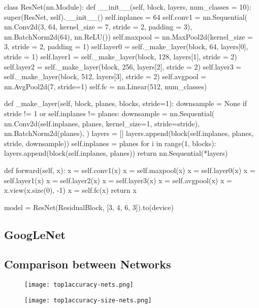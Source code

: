 \begin{python}
class ResNet(nn.Module):
	def __init__(self, block, layers, num_classes = 10):
		super(ResNet, self).__init__()
		self.inplanes = 64
		self.conv1 = nn.Sequential(
			nn.Conv2d(3, 64, kernel_size = 7, stride = 2, padding = 3),
			nn.BatchNorm2d(64),
			nn.ReLU())
		self.maxpool = nn.MaxPool2d(kernel_size = 3, stride = 2, padding = 1)
		self.layer0 = self._make_layer(block, 64, layers[0], stride = 1)
		self.layer1 = self._make_layer(block, 128, layers[1], stride = 2)
		self.layer2 = self._make_layer(block, 256, layers[2], stride = 2)
		self.layer3 = self._make_layer(block, 512, layers[3], stride = 2)
		self.avgpool = nn.AvgPool2d(7, stride=1)
		self.fc = nn.Linear(512, num_classes)
	
	def _make_layer(self, block, planes, blocks, stride=1):
		downsample = None
		if stride != 1 or self.inplanes != planes:
			downsample = nn.Sequential(
				nn.Conv2d(self.inplanes, planes, kernel_size=1, stride=stride),
				nn.BatchNorm2d(planes),
				)
		layers = []
		layers.append(block(self.inplanes, planes, stride, downsample))
		self.inplanes = planes
		for i in range(1, blocks):
			layers.append(block(self.inplanes, planes))
	return nn.Sequential(*layers)
	
	def forward(self, x):
		x = self.conv1(x)
		x = self.maxpool(x)
		x = self.layer0(x)
		x = self.layer1(x)
		x = self.layer2(x)
		x = self.layer3(x)
		x = self.avgpool(x)
		x = x.view(x.size(0), -1)
		x = self.fc(x)
	return x
	
model = ResNet(ResidualBlock, [3, 4, 6, 3]).to(device)
\end{python}

\subsection{GoogLeNet}
\todo{}

\subsection{Comparison between Networks}
\begin{figure}[hbt!]
	\centering
	\begin{minipage}{.5\textwidth}
		\centering
		\texttt{[image: top1accuracy-nets.png]}
		\label{fig:top1accuracy-nets}
	\end{minipage}%
	\begin{minipage}{.5\textwidth}
		\centering
		\texttt{[image: top1accuracy-size-nets.png]}
		\label{fig:top1accuracy-size-nets}
	\end{minipage}
\end{figure}

